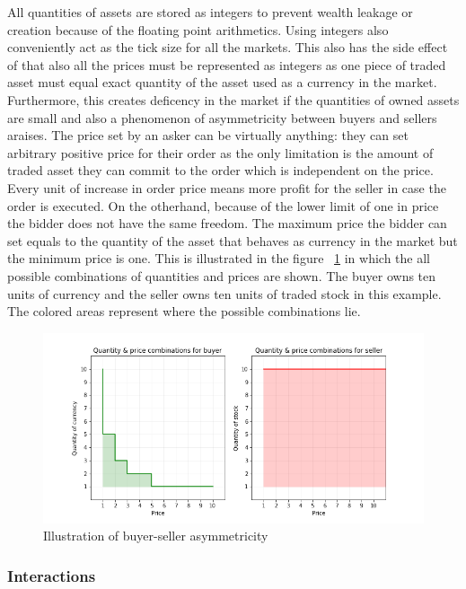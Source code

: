 All quantities of assets are stored as integers to prevent wealth leakage
or creation because of the floating point arithmetics. Using integers also
conveniently act as the tick size for all the markets. This also has the side effect
of that also all the prices must be represented as integers as one piece
of traded asset must equal exact quantity of the asset used as a currency
in the market. Furthermore, this creates deficency in the market if the quantities
of owned assets are small and also a phenomenon of asymmetricity between buyers and sellers
araises. The price set by an asker can be virtually anything: they can set
arbitrary positive price for their order as the only limitation is the amount
of traded asset they can commit to the order which is independent on the price. 
Every unit of increase in order price means more profit for the seller
in case the order is executed. On the otherhand, because of the 
lower limit of one in price the bidder does not have the same freedom.
The maximum price the bidder can set equals to the quantity of the asset
that behaves as currency in the market but the minimum price is one. This is
illustrated in the figure ~\ref{fig:buy_sell_asym} in which the all possible
combinations of quantities and prices are shown. The buyer owns
ten units of currency and the seller owns ten units of traded stock in
this example. The colored areas represent where the possible combinations
lie.

 \begin{figure}
    \includegraphics[width=\linewidth]{plots/buyer_seller_asymmetricity.png}
    \caption{Illustration of buyer-seller asymmetricity}
    \label{fig:buy_sell_asym}
\end{figure}


\subsubsection{Interactions}
